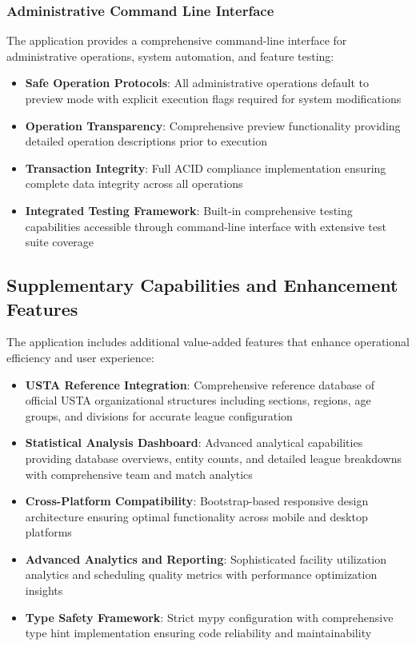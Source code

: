 \subsubsection{Administrative Command Line Interface}
The application provides a comprehensive command-line interface for administrative operations, system automation, and feature testing:

\begin{itemize}
    \item \textbf{Safe Operation Protocols}: All administrative operations default to preview mode with explicit execution flags required for system modifications
    \item \textbf{Operation Transparency}: Comprehensive preview functionality providing detailed operation descriptions prior to execution
    \item \textbf{Transaction Integrity}: Full ACID compliance implementation ensuring complete data integrity across all operations
    \item \textbf{Integrated Testing Framework}: Built-in comprehensive testing capabilities accessible through command-line interface with extensive test suite coverage
\end{itemize}

\subsection{Supplementary Capabilities and Enhancement Features}

The application includes additional value-added features that enhance operational efficiency and user experience:

\begin{itemize}
    \item \textbf{USTA Reference Integration}: Comprehensive reference database of official USTA organizational structures including sections, regions, age groups, and divisions for accurate league configuration
    \item \textbf{Statistical Analysis Dashboard}: Advanced analytical capabilities providing database overviews, entity counts, and detailed league breakdowns with comprehensive team and match analytics
    \item \textbf{Cross-Platform Compatibility}: Bootstrap-based responsive design architecture ensuring optimal functionality across mobile and desktop platforms
    \item \textbf{Advanced Analytics and Reporting}: Sophisticated facility utilization analytics and scheduling quality metrics with performance optimization insights
    \item \textbf{Type Safety Framework}: Strict mypy configuration with comprehensive type hint implementation ensuring code reliability and maintainability
\end{itemize}



